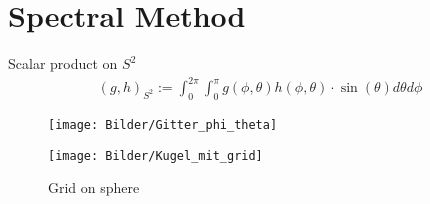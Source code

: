 \section{Spectral Method}
\begin{comment}
\begin{frame}
	\scriptsize
	Consider
\begin{align}
	\partial_{t}\left(\sin \theta f\right) &+ \textcolor{red}{\partial_\theta\left( \sin ^3 \theta \cos \phi f\right)} - \textcolor{blue}{\partial_x(-\cos\phi \sin\theta \cos\theta f)} \\
	&= \textcolor{red}{D_{r}\left(\partial_\theta \left(\sin \theta \partial_\theta f\right)+ \partial_\phi\left(\frac{1}{\sin \theta} \partial_\phi f\right)\right)}. \nonumber 
\end{align}
	\vspace{12pt}
    \pause
     Ansatz for our \textcolor{cyan}{spectral method}
\begin{align}
	f(\phi, \theta, t) \approx f_0(t) \cdot P_0^0 + \sum_{n=1}^{N} \sum_{i=-2n}^{2n} c^i_{2n}(t) \cdot P^i_{2n}(\phi, \theta), \label{ansatz}
\end{align}
    where $P^i_{2n}(\phi, \theta)$ are harmonic polynomial basis functions. 
\end{frame}
\end{comment}



\begin{frame}
	Scalar product on $S^2$
	\begin{align*}
		(g,h)_{S^2} := \int_{0}^{2\pi} \int_{0}^{\pi} g(\phi, \theta) h(\phi, \theta) \cdot \sin(\theta) d\theta d\phi
	\end{align*}
	
	\begin{figure}
		\small
		\begin{minipage}{0.46\textwidth}
			\texttt{[image: Bilder/Gitter\_phi\_theta]}
		\end{minipage}
		\hfill 
		\begin{minipage}{0.5\textwidth}
			\texttt{[image: Bilder/Kugel\_mit\_grid]}
		\end{minipage}
		\caption{Grid on sphere}
	\end{figure}
\end{frame}



